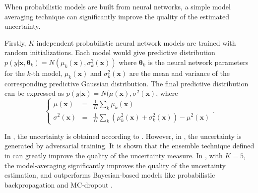 When probabilistic models are built from neural networks, a simple model averaging technique\cite{lazaro2010marginalized, huang2015scalable, lakshminarayanan2017simple} can significantly improve the quality of the estimated uncertainty.

Firstly, $K$ independent probabilistic neural network models are trained with random initializations. Each model would give predictive distribution $p(y | \bm{x}, \bm{\theta}_k) = N(\mu_k(\bm{x}), \sigma_k^2(\bm{x}))$ where $\bm{\theta}_k$ is the neural network parameters for the $k$-th model, $\mu_k(\bm{x})$ and $\sigma_k^2(\bm{x})$ are the mean and variance of the corresponding predictive Gaussian distribution. The final predictive distribution can be expressed as $p(y | \bm{x}) = N(\mu(\bm{x}), \sigma^2(\bm{x})$, where
\begin{equation}
    \left\{
        \begin{array}{lll}
            \mu(\bm{x})      &=& \frac{1}{K} \sum_k \mu_k(\bm{x}) \\
            \sigma^2(\bm{x}) &=& \frac{1}{K} \sum_k (\mu_k^2(\bm{x}) + \sigma_k^2(\bm{x})) - \mu^2(\bm{x})
        \end{array}.
    \right.
    \label{eq:deepensemble}
\end{equation}

In \cite{lazaro2010marginalized, huang2015scalable}, the uncertainty is obtained according to . However, in \cite{lakshminarayanan2017simple}, the uncertainty is generated by adversarial training. It is shown that the ensemble technique defined in  can greatly improve the quality of the uncertainty measure. In \cite{lakshminarayanan2017simple}, with $K = 5$, the model-averaging significantly improves the quality of the uncertainty estimation, and outperforms Bayesian-based models like probabilistic backpropagation \cite{hernandez2015probabilistic} and MC-dropout \cite{gal2016dropout}.
